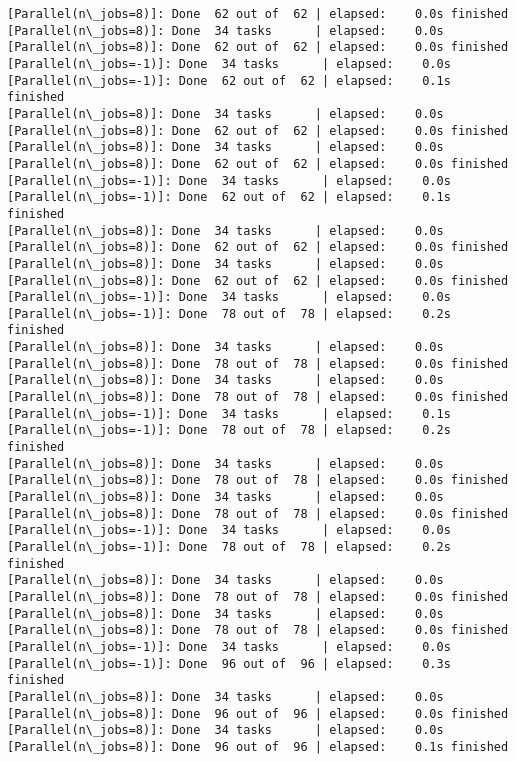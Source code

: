 \documentclass[11pt]{article}
\begin{document}
\begin{Verbatim}[commandchars=\\\{\}]
[Parallel(n\_jobs=8)]: Done  62 out of  62 | elapsed:    0.0s finished
[Parallel(n\_jobs=8)]: Done  34 tasks      | elapsed:    0.0s
[Parallel(n\_jobs=8)]: Done  62 out of  62 | elapsed:    0.0s finished
[Parallel(n\_jobs=-1)]: Done  34 tasks      | elapsed:    0.0s
[Parallel(n\_jobs=-1)]: Done  62 out of  62 | elapsed:    0.1s finished
[Parallel(n\_jobs=8)]: Done  34 tasks      | elapsed:    0.0s
[Parallel(n\_jobs=8)]: Done  62 out of  62 | elapsed:    0.0s finished
[Parallel(n\_jobs=8)]: Done  34 tasks      | elapsed:    0.0s
[Parallel(n\_jobs=8)]: Done  62 out of  62 | elapsed:    0.0s finished
[Parallel(n\_jobs=-1)]: Done  34 tasks      | elapsed:    0.0s
[Parallel(n\_jobs=-1)]: Done  62 out of  62 | elapsed:    0.1s finished
[Parallel(n\_jobs=8)]: Done  34 tasks      | elapsed:    0.0s
[Parallel(n\_jobs=8)]: Done  62 out of  62 | elapsed:    0.0s finished
[Parallel(n\_jobs=8)]: Done  34 tasks      | elapsed:    0.0s
[Parallel(n\_jobs=8)]: Done  62 out of  62 | elapsed:    0.0s finished
[Parallel(n\_jobs=-1)]: Done  34 tasks      | elapsed:    0.0s
[Parallel(n\_jobs=-1)]: Done  78 out of  78 | elapsed:    0.2s finished
[Parallel(n\_jobs=8)]: Done  34 tasks      | elapsed:    0.0s
[Parallel(n\_jobs=8)]: Done  78 out of  78 | elapsed:    0.0s finished
[Parallel(n\_jobs=8)]: Done  34 tasks      | elapsed:    0.0s
[Parallel(n\_jobs=8)]: Done  78 out of  78 | elapsed:    0.0s finished
[Parallel(n\_jobs=-1)]: Done  34 tasks      | elapsed:    0.1s
[Parallel(n\_jobs=-1)]: Done  78 out of  78 | elapsed:    0.2s finished
[Parallel(n\_jobs=8)]: Done  34 tasks      | elapsed:    0.0s
[Parallel(n\_jobs=8)]: Done  78 out of  78 | elapsed:    0.0s finished
[Parallel(n\_jobs=8)]: Done  34 tasks      | elapsed:    0.0s
[Parallel(n\_jobs=8)]: Done  78 out of  78 | elapsed:    0.0s finished
[Parallel(n\_jobs=-1)]: Done  34 tasks      | elapsed:    0.0s
[Parallel(n\_jobs=-1)]: Done  78 out of  78 | elapsed:    0.2s finished
[Parallel(n\_jobs=8)]: Done  34 tasks      | elapsed:    0.0s
[Parallel(n\_jobs=8)]: Done  78 out of  78 | elapsed:    0.0s finished
[Parallel(n\_jobs=8)]: Done  34 tasks      | elapsed:    0.0s
[Parallel(n\_jobs=8)]: Done  78 out of  78 | elapsed:    0.0s finished
[Parallel(n\_jobs=-1)]: Done  34 tasks      | elapsed:    0.0s
[Parallel(n\_jobs=-1)]: Done  96 out of  96 | elapsed:    0.3s finished
[Parallel(n\_jobs=8)]: Done  34 tasks      | elapsed:    0.0s
[Parallel(n\_jobs=8)]: Done  96 out of  96 | elapsed:    0.0s finished
[Parallel(n\_jobs=8)]: Done  34 tasks      | elapsed:    0.0s
[Parallel(n\_jobs=8)]: Done  96 out of  96 | elapsed:    0.1s finished

\end{Verbatim}
\end{document}
